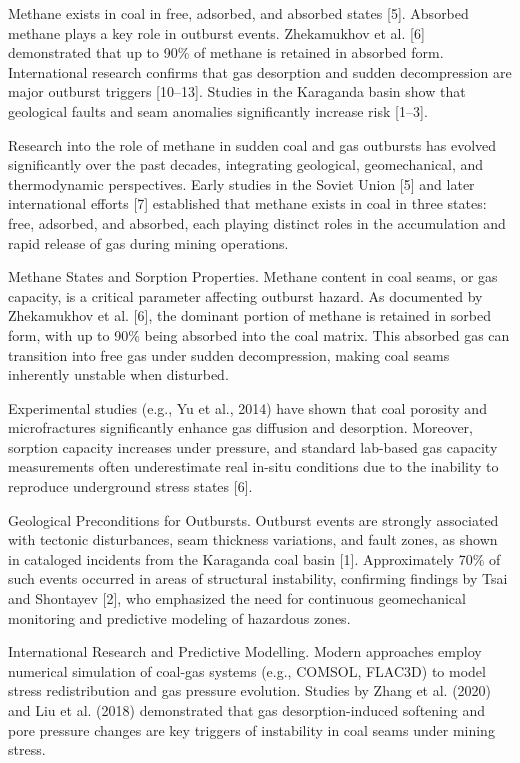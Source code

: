 \begin{multicols}{2}
Methane exists in coal in free, adsorbed, and absorbed states {[}5{]}.
Absorbed methane plays a key role in outburst events. Zhekamukhov et al.
{[}6{]} demonstrated that up to 90\% of methane is retained in absorbed
form. International research confirms that gas desorption and sudden
decompression are major outburst triggers {[}10--13{]}. Studies in the
Karaganda basin show that geological faults and seam anomalies
significantly increase risk {[}1--3{]}.

Research into the role of methane in sudden coal and gas outbursts has
evolved significantly over the past decades, integrating geological,
geomechanical, and thermodynamic perspectives. Early studies in the
Soviet Union {[}5{]} and later international efforts {[}7{]} established
that methane exists in coal in three states: free, adsorbed, and
absorbed, each playing distinct roles in the accumulation and rapid
release of gas during mining operations.

Methane States and Sorption Properties. Methane content in coal seams,
or gas capacity, is a critical parameter affecting outburst hazard. As
documented by Zhekamukhov et al. {[}6{]}, the dominant portion of
methane is retained in sorbed form, with up to 90\% being absorbed into
the coal matrix. This absorbed gas can transition into free gas under
sudden decompression, making coal seams inherently unstable when
disturbed.

Experimental studies (e.g., Yu et al., 2014) have shown that coal
porosity and microfractures significantly enhance gas diffusion and
desorption. Moreover, sorption capacity increases under pressure, and
standard lab-based gas capacity measurements often underestimate real
in-situ conditions due to the inability to reproduce underground stress
states {[}6{]}.

Geological Preconditions for Outbursts. Outburst events are strongly
associated with tectonic disturbances, seam thickness variations, and
fault zones, as shown in cataloged incidents from the Karaganda coal
basin {[}1{]}. Approximately 70\% of such events occurred in areas of
structural instability, confirming findings by Tsai and Shontayev
{[}2{]}, who emphasized the need for continuous geomechanical monitoring
and predictive modeling of hazardous zones.

International Research and Predictive Modelling. Modern approaches
employ numerical simulation of coal-gas systems (e.g., COMSOL, FLAC3D)
to model stress redistribution and gas pressure evolution. Studies by
Zhang et al. (2020) and Liu et al. (2018) demonstrated that gas
desorption-induced softening and pore pressure changes are key triggers
of instability in coal seams under mining stress.


\end{multicols}
